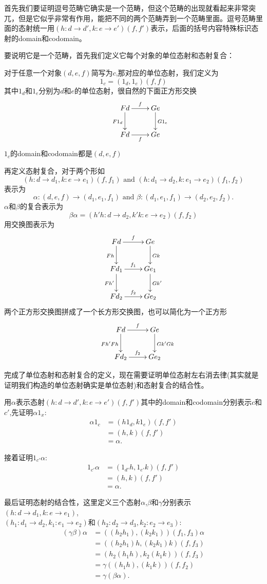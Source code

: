 \documentclass[UTF8,11pt,a4paper]{ctexart}
\newcommand{\al}{\alpha}
\newcommand{\be}{\beta}
\newcommand{\gm}{\gamma}
\newcommand{\AND}{\text{ and }}
\newcommand*{\xfunc}[4]{{#2}\colon{#3}{#1}{#4}}
\newcommand*{\func}[3]{\xfunc{\to}{#1}{#2}{#3}}
\newcommand*{\qty}[1]{\left({#1}\right)}
\begin{document}
首先我们要证明逗号范畴它确实是一个范畴，但这个范畴的出现就看起来非常突兀，但是它似乎非常有作用，能把不同的两个范畴弄到一个范畴里面。逗号范畴里面的态射统一用$\qty{\func{h}{d}{d'},\func{k}{e}{e'}} \qty{f,f'}$表示，后面的括号内容特殊标识态射的domain和codomain。

要说明它是一个范畴，首先我们定义它每个对象的单位态射和态射复合：

对于任意一个对象$\qty{d,e,f}$简写为$c$,那对应的单位态射，我们定义为\[ 1_c  = \qty{1_{d},1_{e}}\qty{f,f}\]其中$1_d$和$1_e$分别为$d$和$e$的单位态射，很自然的下面正方形交换
\[\xymatrix{ &Fd \ar[d]_{F1_{d}} \ar[r]^{f} & Ge\ar[d]^{G1_{e}}
						 \\  & Fd\ar[r]_{f} &Ge   } \]
$1_c$的domain和codomain都是$\qty{d,e,f}$

再定义态射复合，对于两个形如
$$\qty{\func{h}{d}{d_1},\func{k}{e}{e_1}} \qty{f,f_1} \AND
	\qty{\func{h}{d_1}{d_2},\func{k}{e_1}{e_2}} \qty{f_1,f_2}$$ 
表示为
$$\func{\al}{(d,e,f)}{(d_1,e_1,f_1)} \AND
	\func{\be}{(d_1,e_1,f_1)}{(d_2,e_2,f_2)}.$$ $\al$和$\be$的复合表示为
\[\be  \al=\qty{\func{h'  h}{d}{d_{2}},\func{k'  k}{e}{e_{2}}}\qty{f,f_2}\]用交换图表示为\[\xymatrix{ Fd \ar[d]_{Fh} \ar[r]^{f} & Ge\ar[d]^{Gk}  \\
			Fd_{1} \ar[d]_{Fh'}\ar[r]^{f_{1}}& Ge_{1} \ar[d]^{Gk'} \\
	Fd_{2} \ar[r]^{f_{2}} &Ge_2 } \]两个正方形交换图拼成了一个长方形交换图，也可以简化为一个正方形\[\xymatrix{ &Fd \ar[d]_{Fh'  Fh}\ar[r]^{f} & Ge\ar[d]^{Gk' Gk}
			 \\  & Fd_2\ar[r]^{f_2} &Ge_2 }\]
			 
完成了单位态射和态射复合的定义，现在需要证明单位态射左右消去律(其实就是证明我们构造的单位态射确实是单位态射)和态射复合的结合性。

用$\al$表示态射$\qty{\func{h}{d}{d'},\func{k}{e}{e'}} \qty{f,f'}$其中的domain和codomain分别表示$c$和$c'$,先证明$\al 1_x$:
\begin{align*}
	\al  1_{c } &= \qty{h 1_{d},k 1_{e}}\qty{f,f'}\\
	&= \qty{h,k}\qty{f,f'} \\
	 &= \al.
\end{align*}

接着证明$1_{c'}\al$:
\begin{align*}
	1_{c' } \al &= \qty{1_{d'} h, 1_{e'} k}\qty{f,f'}\\
	&= \qty{h,k}\qty{f,f'}\\
	&= \al.
\end{align*}

最后证明态射的结合性，这里定义三个态射$\al$,$\be$和$\gm$分别表示$\qty{\func{h}{d}{d_1},\func{k}{e}{e_1}}$,\\$\qty{\func{h_1}{d_1}{d_2},\func{k_1}{e_1}{e_2}}$和$\qty{\func{h_2}{d_2}{d_3},\func{k_2}{e_2}{e_3}}$:
\begin{align*}
	(\gm\be)\al&=((h_2h_1),(k_2 k_1))(f_1,f_3) \al\\
	&=((h_2 h_1) h,(k_2 k_1) k)(f,f_3)\\
	&=(h_2(h_1 h),k_2(k_1 k))(f,f_3)\\
	&=\gm((h_1 h),(k_1 k))(f,f_2)\\
	&=\gm(\be \al).
\end{align*}
\end{document}
